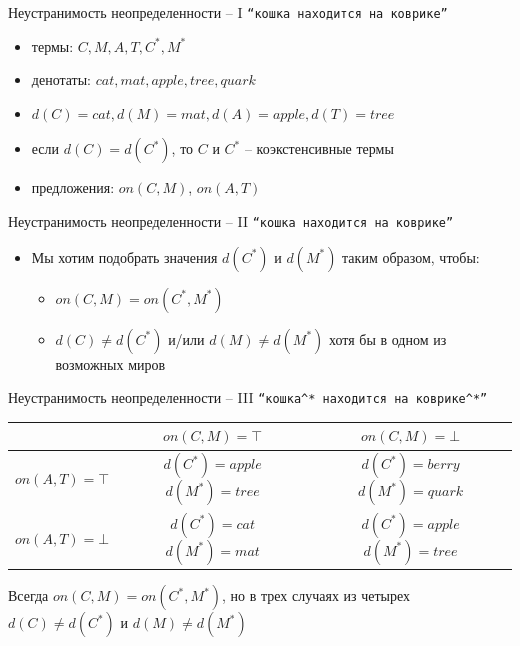 \documentclass{beamer}
\begin{document}
\begin{frame}{Неустранимость неопределенности -- I}
\texttt{``кошка находится на коврике''}
\bigskip
\begin{itemize}
        \item термы: $C, M, A, T, C^*, M^*$
        \smallskip
        \item денотаты: $cat, mat, apple, tree, quark$
        \smallskip
        \item $d(C) = cat, d(M) = mat, d(A) = apple, d(T) = tree$
        \smallskip
        \item если $d(C) = d(C^*)$, то $C$ и $C^*$ -- коэкстенсивные термы
        \smallskip
        \item предложения: $on(C,M)$, $on(A,T)$
\end{itemize}
\end{frame}

\begin{frame}{Неустранимость неопределенности -- II}
\texttt{``кошка находится на коврике''}
\bigskip
\begin{itemize}
	\item Мы хотим подобрать значения $d(C^*)$ и $d(M^*)$ таким образом, чтобы:
	    \smallskip
	    \begin{itemize}
	        \item $on(C, M) = on(C^*, M^*)$
	        \smallskip
	        \item $d(C) \neq d(C^*)$ и/или $d(M) \neq d(M^*)$ хотя бы в одном из возможных миров
	    \end{itemize}
\end{itemize}
\end{frame}

\begin{frame}{Неустранимость неопределенности -- III}
\texttt{``кошка$^*$ находится на коврике$^*$''}
\bigskip
\begin{table}
    \begin{tabular}{|l|c|c|}
        \hline
        ~                & $on(C,M) = \top$                 & $on(C,M) = \bot$                  \\ \hline
        $on(A,T) = \top$ & \parbox[t]{3cm}{$d(C^*) = apple$\\ $d(M^*) = tree$} & \parbox[t]{3cm}{$d(C^*) = berry$\\ $d(M^*) = quark$} \\ 
        $on(A,T) = \bot$ & \parbox[t]{3cm}{$d(C^*) = cat$\\ $d(M^*) = mat$} & \parbox[t]{3cm}{$d(C^*) = apple$\\ $d(M^*) = tree$} \\
        \hline
    \end{tabular}
\end{table}
\bigskip
Всегда $on(C,M) = on(C^*,M^*)$, но в трех случаях из четырех $d(C) \neq d(C^*)$ и $d(M) \neq d(M^*)$
\end{frame}
\end{document}
